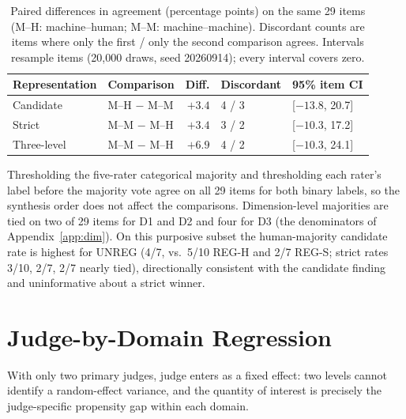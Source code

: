 \documentclass[11pt]{article}
\begin{document}
\begin{table}[H]
\centering
\scriptsize
\setlength{\tabcolsep}{4pt}
\begin{tabular}{@{}llrll@{}}
\toprule
Representation & Comparison & Diff. & Discordant & 95\% item CI \\
\midrule
Candidate & M--H $-$ M--M & $+3.4$ & 4 / 3 & [$-13.8$, 20.7] \\
Strict & M--M $-$ M--H & $+3.4$ & 3 / 2 & [$-10.3$, 17.2] \\
Three-level & M--M $-$ M--H & $+6.9$ & 4 / 2 & [$-10.3$, 24.1] \\
\bottomrule
\end{tabular}
\caption{Paired differences in agreement (percentage points) on the same 29 items (M--H: machine--human; M--M: machine--machine). Discordant counts are items where only the first / only the second comparison agrees. Intervals resample items (20,000 draws, seed 20260914); every interval covers zero.}
\label{tab:paireddiff}
\end{table}

Thresholding the five-rater categorical majority and thresholding each rater's label before the majority vote agree on all 29 items for both binary labels, so the synthesis order does not affect the comparisons. Dimension-level majorities are tied on two of 29 items for D1 and D2 and four for D3 (the denominators of Appendix~\ref{app:dim}). On this purposive subset the human-majority candidate rate is highest for UNREG (4/7, vs.\ 5/10 REG-H and 2/7 REG-S; strict rates 3/10, 2/7, 2/7 nearly tied), directionally consistent with the candidate finding and uninformative about a strict winner.

\section{Judge-by-Domain Regression}
\label{app:logit}

With only two primary judges, judge enters as a fixed effect: two levels cannot identify a random-effect variance, and the quantity of interest is precisely the judge-specific propensity gap within each domain.
\end{document}
